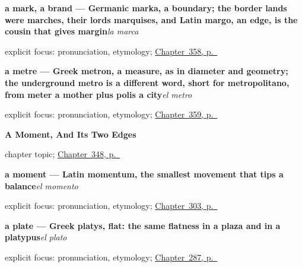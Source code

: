 \noindent\begin{minipage}[t]{\linewidth}
\raggedright
\textbf{a mark, a brand — Germanic marka, a boundary; the border lands were marches, their lords marquises, and Latin margo, an edge, is the cousin that gives margin}\enspace\emph{la marca}\par
\footnotesize explicit focus: pronunciation, etymology; \hyperref[ch:el-color-y-el-tamano]{Chapter~358, p.~\pageref*{ch:el-color-y-el-tamano}}
\end{minipage}\par\smallskip

\noindent\begin{minipage}[t]{\linewidth}
\raggedright
\textbf{a metre — Greek metron, a measure, as in diameter and geometry; the underground metro is a different word, short for metropolitano, from meter a mother plus polis a city}\enspace\emph{el metro}\par
\footnotesize explicit focus: pronunciation, etymology; \hyperref[ch:el-kilo-y-el-litro]{Chapter~359, p.~\pageref*{ch:el-kilo-y-el-litro}}
\end{minipage}\par\smallskip

\noindent\begin{minipage}[t]{\linewidth}
\raggedright
\textbf{A Moment, And Its Two Edges}\par
\footnotesize chapter topic; \hyperref[ch:el-principio-y-el-fin]{Chapter~348, p.~\pageref*{ch:el-principio-y-el-fin}}
\end{minipage}\par\smallskip

\noindent\begin{minipage}[t]{\linewidth}
\raggedright
\textbf{a moment — Latin momentum, the smallest movement that tips a balance}\enspace\emph{el momento}\par
\footnotesize explicit focus: pronunciation, etymology; \hyperref[ch:reparaciones]{Chapter~303, p.~\pageref*{ch:reparaciones}}
\end{minipage}\par\smallskip

\noindent\begin{minipage}[t]{\linewidth}
\raggedright
\textbf{a plate — Greek platys, flat: the same flatness in a plaza and in a platypus}\enspace\emph{el plato}\par
\footnotesize explicit focus: pronunciation, etymology; \hyperref[ch:cinco-cosas]{Chapter~287, p.~\pageref*{ch:cinco-cosas}}
\end{minipage}\par\smallskip

